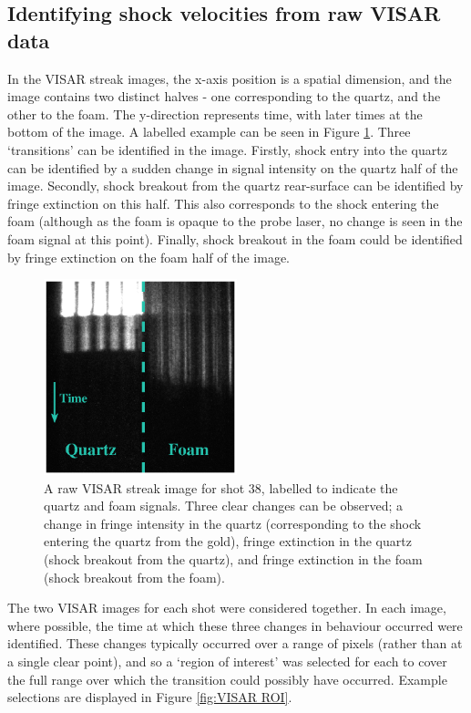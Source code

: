 \subsection{Identifying shock velocities from raw VISAR data}

In the VISAR streak images, the x-axis position is a spatial dimension, and the image contains two distinct halves - one corresponding to the quartz, and the other to the foam. The y-direction represents time, with later times at the bottom of the image. A labelled example can be seen in Figure \ref{fig:VISARImage}. Three `transitions' can be identified in the image. Firstly, shock entry into the quartz can be identified by a sudden change in signal intensity on the quartz half of the image. Secondly, shock breakout from the quartz rear-surface can be identified by fringe extinction on this half. This also corresponds to the shock entering the foam (although as the foam is opaque to the probe laser, no change is seen in the foam signal at this point). Finally, shock breakout in the foam could be identified by fringe extinction on the foam half of the image.

\begin{figure} [h]
\begin{centering}
\includegraphics[width=0.5\textwidth]{figures/Experiment/VISARImage.eps}%
\caption{\label{fig:VISARImage} A raw VISAR streak image for shot 38, labelled to indicate the quartz and foam signals. Three clear changes can be observed; a change in fringe intensity in the quartz (corresponding to the shock entering the quartz from the gold), fringe extinction in the quartz (shock breakout from the quartz), and fringe extinction in the foam (shock breakout from the foam). }
\end{centering}
\end{figure}

The two VISAR images for each shot were considered together. In each image, where possible, the time at which these three changes in behaviour occurred were identified. These changes typically occurred over a range of pixels (rather than at a single clear point), and so a `region of interest' was selected for each to cover the full range over which the transition could possibly have occurred. Example selections are displayed in Figure \ref{fig:VISAR ROI}.

